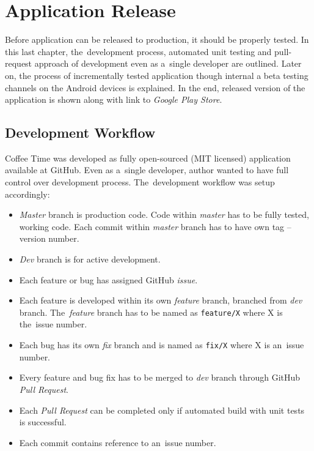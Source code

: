 \chapter{Application Release}
\label{ch:testing}

Before application can be released to production, it should be properly tested. In this last chapter, the~development process, automated unit testing and pull-request approach of development even as a~single developer are outlined. Later on, the process of incrementally tested application though internal a beta testing channels on the Android devices is explained. In the end, released version of the application is shown along with link to \textit{Google Play Store}. 

\section{Development Workflow}
Coffee Time was developed as fully open-sourced (MIT licensed) application available at GitHub. Even as a~single developer, author wanted to have full control over development process. The~development workflow was setup accordingly:

\begin{itemize}
    \item \textit{Master} branch is production code. Code within \textit{master} has to be fully tested, working code. Each commit within \textit{master} branch has to have own tag -- version number.
    \item \textit{Dev} branch is for active development. 
    \item Each feature or bug has assigned GitHub \textit{issue}.  
    \item Each feature is developed within its own \textit{feature} branch, branched from \textit{dev} branch. The~\textit{feature} branch has to be named as \verb|feature/X| where X is the~issue number.
    \item Each bug has its own \textit{fix} branch and is named as \verb|fix/X| where X is an~issue number.
    \item Every feature and bug fix has to be merged to \textit{dev} branch through GitHub \textit{Pull Request}.
    \item Each \textit{Pull Request} can be completed only if automated build with unit tests is successful.
    \item Each commit contains reference to an~issue number. 
\end{itemize}

